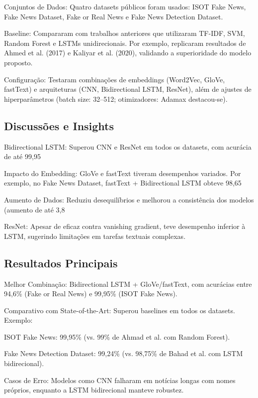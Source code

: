 \documentclass[conference]{IEEEtran}
\begin{document}
Conjuntos de Dados: Quatro datasets públicos foram usados: ISOT Fake News, Fake News Dataset, Fake or Real News e Fake News Detection Dataset.

Baseline: Compararam com trabalhos anteriores que utilizaram TF-IDF, SVM, Random Forest e LSTMs unidirecionais. Por exemplo, replicaram resultados de Ahmed et al. (2017) e Kaliyar et al. (2020), validando a superioridade do modelo proposto.

Configuração: Testaram combinações de embeddings (Word2Vec, GloVe, fastText) e arquiteturas (CNN, Bidirectional LSTM, ResNet), além de ajustes de hiperparâmetros (batch size: 32–512; otimizadores: Adamax destacou-se).

\subsection{Discussões e Insights}

Bidirectional LSTM: Superou CNN e ResNet em todos os datasets, com acurácia de até 99,95%

Impacto do Embedding: GloVe e fastText tiveram desempenhos variados. Por exemplo, no Fake News Dataset, fastText + Bidirectional LSTM obteve 98,65%

Aumento de Dados: Reduziu desequilíbrios e melhorou a consistência dos modelos (aumento de até 3,8%

ResNet: Apesar de eficaz contra vanishing gradient, teve desempenho inferior à LSTM, sugerindo limitações em tarefas textuais complexas.

\subsection{Resultados Principais}

Melhor Combinação: Bidirectional LSTM + GloVe/fastText, com acurácias entre 94,6\% (Fake or Real News) e 99,95\% (ISOT Fake News).

Comparativo com State-of-the-Art: Superou baselines em todos os datasets. Exemplo:

ISOT Fake News: 99,95\% (vs. 99\% de Ahmad et al. com Random Forest).

Fake News Detection Dataset: 99,24\% (vs. 98,75\% de Bahad et al. com LSTM bidirecional).

Casos de Erro: Modelos como CNN falharam em notícias longas com nomes próprios, enquanto a LSTM bidirecional manteve robustez.
\end{document}
